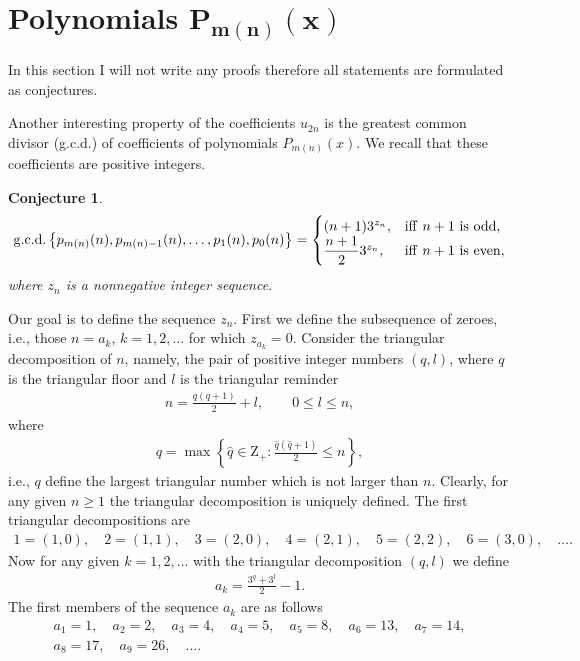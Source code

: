 \documentclass[pdftex]{sigma}
\numberwithin{equation}{section}
\newtheorem{Conjecture}[Theorem]{Conjecture}
\begin{document}
\section[Polynomials $P_{m(n)}(x)$]{Polynomials $\boldsymbol{P_{m(n)}(x)}$}\label{sec:polynom-conjectures}
In this section I will not write any proofs therefore all statements are formulated as conjectures.

Another interesting property of the coefficients $u_{2n}$ is the greatest common divisor (g.c.d.) of coefficients of
polynomials $P_{m(n)}(x)$. We recall that these coefficients are positive integers.
\begin{Conjecture}\label{con:gen}
\begin{gather}\label{eq:gcd}
{\rm g.c.d.}\left\{p_{m(n)}(n), p_{m(n)-1}(n),\ldots,p_1(n), p_0(n)\right\}=
\begin{cases}
(n+1) 3^{z_n},& {\rm iff} \ n+1 \ \text{is odd},\\
\dfrac{n+1}2 3^{z_n},& {\rm iff} \ n+1 \ \text{is even},
\end{cases}
\end{gather}
where $z_n$ is a nonnegative integer sequence.
\end{Conjecture}
Our goal is to define the sequence $z_n$. First we define the subsequence of zeroes, i.e., those $n=a_k$,
$k=1,2,\ldots$ for which $z_{a_k}=0$.
Consider the triangular decomposition of $n$, namely, the pair of positive integer numbers $(q,l)$,
where $q$ is the triangular floor and $l$ is the triangular reminder
\begin{gather*}
n=\frac{q(q+1)}2+l,\qquad0\leq l\leq n,
\end{gather*}
where
\begin{gather*}
q=\max\left\{\hat{q}\in\mathrm Z_{+}\colon \frac{\hat{q}(\hat{q}+1)}2\leq n\right\},
\end{gather*}
i.e., $q$ define the largest triangular number which is not larger than $n$. Clearly, for any given $n\geq1$ the triangular decomposition is uniquely defined. The first triangular decompositions are
\begin{gather*}
1=(1,0),\quad
2=(1,1),\quad
3=(2,0),\quad
4=(2,1),\quad
5=(2,2),\quad
6=(3,0),\quad \ldots.
\end{gather*}
Now for any given $k=1,2,\ldots$ with the triangular decomposition $(q,l)$ we define
\begin{gather}\label{eq:a-k}
a_k=\frac{3^q+3^l}2-1.
\end{gather}
The first members of the sequence $a_k$ are as follows
\begin{gather*}
a_1=1,\quad
a_2=2,\quad
a_3=4,\quad
a_4=5,\quad
a_5=8,\quad
a_6=13,\quad
a_7=14,\\
a_8=17,\quad
a_9=26,\quad\ldots.
\end{gather*}
\end{document}
